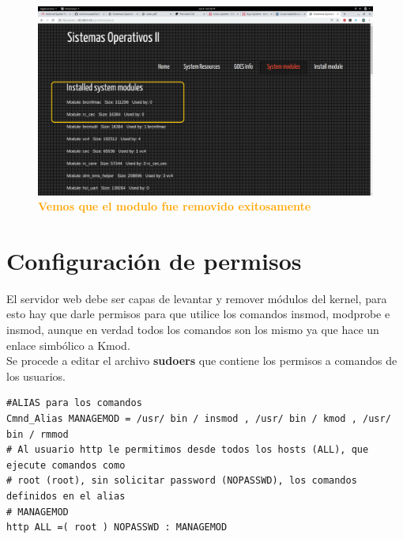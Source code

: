 \documentclass{article}
\begin{document}
                  \begin{figure}[H]
    \centering
      \includegraphics[width=1.0\textwidth]{figures/17.png}
       \centering
       \caption{\textbf{\textcolor{Orange}{Vemos que el modulo fue removido exitosamente}}}
         \end{figure}
         
\clearpage

\section{ Configuración de permisos}


El servidor web debe ser capas de levantar y remover módulos del kernel, para esto hay que darle permisos para que utilice los comandos insmod, modprobe e insmod, aunque
en verdad todos los comandos son los mismo ya que hace un enlace simbólico a Kmod.\\

Se procede a editar el archivo \textbf{sudoers} que contiene los permisos a comandos de los usuarios.\\

\begin{lstlisting}[style=PerlStyle]
#ALIAS para los comandos
Cmnd_Alias MANAGEMOD = /usr/ bin / insmod , /usr/ bin / kmod , /usr/ bin / rmmod
# Al usuario http le permitimos desde todos los hosts (ALL), que ejecute comandos como
# root (root), sin solicitar password (NOPASSWD), los comandos definidos en el alias
# MANAGEMOD
http ALL =( root ) NOPASSWD : MANAGEMOD
\end{lstlisting}
\end{document}

